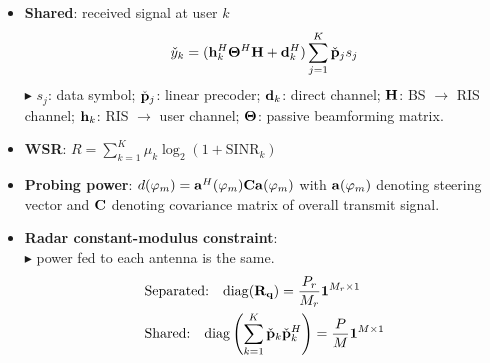 \documentclass[paperwidth=841mm,paperheight=1300mm,portrait]{baposter}
\begin{document}
\begin{poster}
{\begin{minipage}[c]{\textwidth}
\begin{itemize}[leftmargin=1.4 em]
\vspace{-2pt}
\item \textbf{Shared}: received signal at user $k$
\vspace{-4pt}
\begin{equation}\notag
    \check{y}_k = ({\bf h}_k^H {\bf \Theta}^H {\bf H} + {\bf d}_k^H) \sum_{j=1}^K \check{\bf p}_j s_j
\end{equation}
${\blacktriangleright}$ $s_j$: data symbol; $\check{\bf p}_j$: linear precoder; ${\bf d}_{k}$: direct channel;
${\bf H}$: BS $\rightarrow$ RIS channel; ${\bf h}_k$: RIS $\rightarrow$ user channel; ${\bf \Theta}$: passive beamforming matrix.
\small

\item \textbf{WSR}: $R = \sum_{k=1}^K \mu_k \log_2(1+\mathrm{SINR}_k)$
\item \textbf{Probing power}: $d(\varphi_m) = {\bf{a}}^H(\varphi_m) {\bf{C}} {\bf{a}}(\varphi_m)$ with ${\bf a}(\varphi_m)$ denoting steering vector and ${\bf C}$ denoting covariance matrix of overall transmit signal.
\item \textbf{Radar constant-modulus constraint}:\\
${\blacktriangleright}$ power fed to each antenna is the same.
\begin{align*}
    &\text{Separated:} \quad \mathrm{diag}(\mathbf{R}_{\bf q}) = \frac{P_r}{M_r}\mathbf{1}^{M_r \times 1}\\
    &\text{Shared:} \quad \mathrm{diag}\left( \sum_{k=1}^K \check{\bf p}_k \check{\bf p}_k^H \right) = \frac{P}{M}{\bf 1}^{M \times 1}
\end{align*}
\end{itemize}
\end{minipage}
}

\end{poster}
\end{document}
